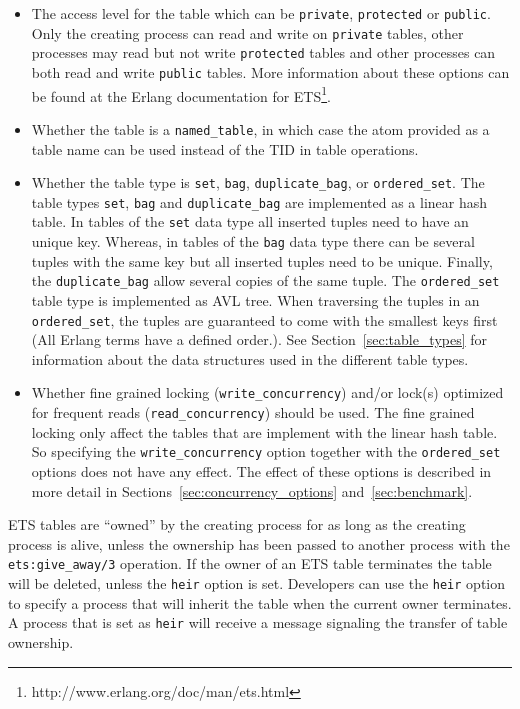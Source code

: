 \documentclass[aps,pre,preprint,nofootinbib]{revtex4}
\begin{document}
\begin{itemize}
\item
  The access level for the table which can be \verb|private|, \verb|protected| or \verb|public|.
  Only the creating process can read and write on \verb|private| tables, other processes may read but not write \verb|protected| tables and other processes can both read and write \verb|public| tables.
  More information about these options can be found at the Erlang documentation for ETS\footnote{http://www.erlang.org/doc/man/ets.html}.
\item
  Whether the table is a \verb|named_table|, in which case the atom provided as a table name can be used instead of the TID in table operations.
\item
  Whether the table type is \verb|set|, \verb|bag|, \verb|duplicate_bag|, or \verb|ordered_set|.
  The table types \verb|set|, \verb|bag| and \verb|duplicate_bag| are implemented as a linear hash table.
  In tables of the \verb|set| data type all inserted tuples need to have an unique key.
  Whereas, in tables of the \verb|bag| data type there can be several tuples with the same key but all inserted tuples need to be unique.
  Finally, the \verb|duplicate_bag| allow several copies of the same tuple.
  The \verb|ordered_set| table type is implemented as AVL tree.
  When traversing the tuples in an \verb|ordered_set|, the tuples are guaranteed to come with the smallest keys first (All Erlang terms have a defined order.).
  See Section~\ref{sec:table_types} for information about the data structures used in the different table types.
\item
  Whether fine grained locking (\verb|write_concurrency|) and/or lock(s) optimized for frequent reads (\verb|read_concurrency|) should be used.
  The fine grained locking only affect the tables that are implement with the linear hash table.
  So specifying the \verb|write_concurrency| option together with the \verb|ordered_set| options does not have any effect.
  The effect of these options is described in more detail in Sections~\ref{sec:concurrency_options} and~\ref{sec:benchmark}.
\end{itemize}

ETS tables are ``owned'' by the creating process for as long as the creating process is alive, unless the ownership has been passed to another process with the \verb|ets:give_away/3| operation.
If the owner of an ETS table terminates the table will be deleted, unless the \verb|heir| option is set.
Developers can use the \verb|heir| option to specify a process that will inherit the table when the current owner terminates.
A process that is set as \verb|heir| will receive a message signaling the transfer of table ownership.
\end{document}
